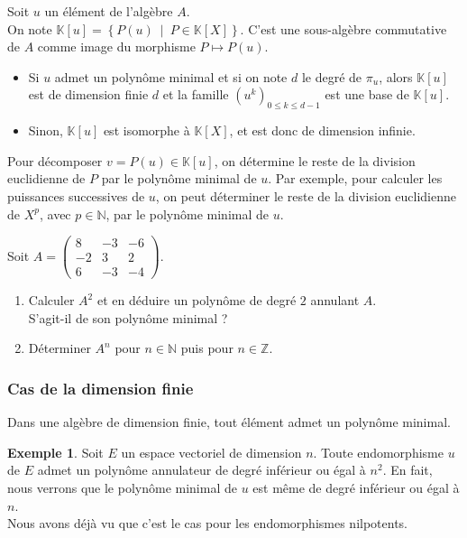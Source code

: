 \documentclass[french]{article}
\newcommand{\N}{\mathbb{N}}
\newcommand{\Z}{\mathbb{Z}}
\newcommand{\K}{\mathbb{K}}
\theoremstyle{plain}
\theoremstyle{definition}
\newtheorem*{ex}{Exemple}
\theoremstyle{remark}
\begin{document}
Soit $u$ un élément de l'algèbre $A$. \\
On note $\K[u]=\left\{P(u)\ \mid\ P\in\K[X]\right\}$. C'est une sous-algèbre commutative de $A$ comme image du morphisme $P\mapsto P(u)$.

\begin{prop}%
	\begin{itemize}
		\item Si $u$ admet un polynôme minimal et si on note $d$ le degré de $\pi_u$, alors $\K[u]$ est de dimension finie $d$ et la famille $(u^k)_{0\leqslant k\leqslant d-1}$ est une base de $\K[u]$.
		\item Sinon, $\K[u]$ est isomorphe à $\K[X]$, et est donc de dimension infinie.
	\end{itemize}
\end{prop}

\begin{met}
	Pour décomposer $v=P(u)\in\K[u]$, on détermine le reste de la division euclidienne de $P$ par le polynôme minimal de $u$. Par exemple, pour calculer les puissances successives de $u$, on peut déterminer le reste de la division euclidienne de $X^p$, avec $p\in\N$, par le polynôme minimal de $u$.
\end{met}

\begin{exo}
	Soit $A=\displaystyle\begin{pmatrix}
		8&-3&-6\\
		-2&3&2\\
		6&-3&-4
	\end{pmatrix}$.
	\begin{enumerate}
		\item Calculer $A^2$ et en déduire un polynôme de degré $2$ annulant $A$. \\ S'agit-il de son polynôme minimal ?
		\item Déterminer $A^n$ pour $n\in\N$ puis pour $n\in\Z$.
	\end{enumerate}
\end{exo}

\subsubsection*{Cas de la dimension finie}

\begin{prop}%
	Dans une algèbre de dimension finie, tout élément admet un polynôme minimal.
\end{prop}

\begin{ex}
	Soit $E$ un espace vectoriel de dimension $n$. Toute endomorphisme $u$ de $E$ admet un polynôme annulateur de degré inférieur ou égal à $n^2$. En fait, nous verrons que le polynôme minimal de $u$ est même de degré inférieur ou égal à $n$. \\ Nous avons déjà vu que c'est le cas pour les endomorphismes nilpotents.
\end{ex}
\end{document}
